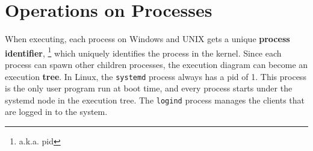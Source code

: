 \documentclass{tufte-handout}
\begin{document}
\section{Operations on Processes}
When executing, each process on Windows and UNIX gets a unique \textbf{process identifier}, 
\footnote{a.k.a. pid}
which uniquely identifies the process in the kernel. Since each process can spawn other 
children processes, the execution diagram can become an execution \textbf{tree}. In Linux, 
the \texttt{systemd} process always has a pid of 1. This process is the only user program
run at boot time, and every process starts under the systemd node in the execution tree. 
The \texttt{logind} process manages the clients that are logged in to the system.
\end{document}
